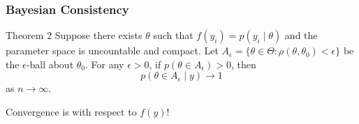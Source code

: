\documentclass{beamer}
\begin{document}
\begin{frame}
\frametitle{Bayesian Consistency}

\begin{block}{Theorem 2}
Suppose there exists $\theta$ such that $f(y_i) = p(y_i \mid \theta)$ and the parameter space is uncountable and compact. Let $A_{\epsilon} = \{ \theta \in \Theta : \rho(\theta, \theta_0 ) < \epsilon \}$ be the $\epsilon$-ball about $\theta_0$. For any $\epsilon > 0$, if $p(\theta \in A_{\epsilon}) > 0$, then
$$
p(\theta \in A_{\epsilon} \mid y) \to 1 
$$
as $n \to \infty$.
\end{block}
Convergence is with respect to $f(y)$!


\end{frame}
\end{document}
